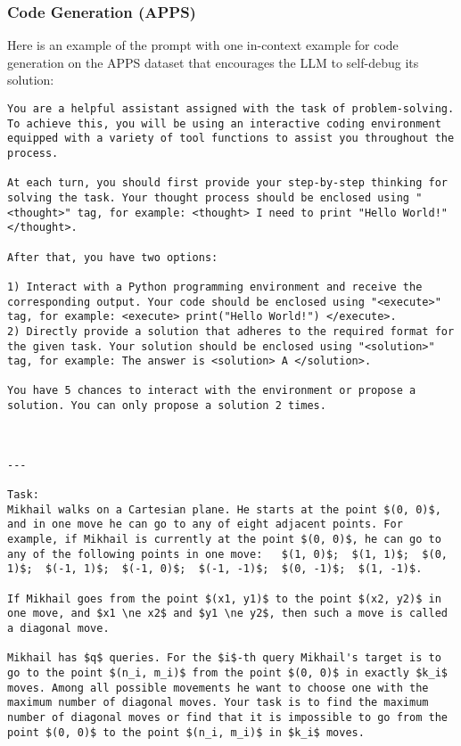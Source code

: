 \subsubsection{Code Generation (APPS)}
\label{sec:interaction_data_gen_prompt_code}

Here is an example of the prompt with one in-context example for code generation on the APPS dataset \citep{hendrycks2021measuring} that encourages the LLM to self-debug its solution:

\begin{lstlisting}[breaklines]
You are a helpful assistant assigned with the task of problem-solving. To achieve this, you will be using an interactive coding environment equipped with a variety of tool functions to assist you throughout the process.

At each turn, you should first provide your step-by-step thinking for solving the task. Your thought process should be enclosed using "<thought>" tag, for example: <thought> I need to print "Hello World!" </thought>.

After that, you have two options:

1) Interact with a Python programming environment and receive the corresponding output. Your code should be enclosed using "<execute>" tag, for example: <execute> print("Hello World!") </execute>.
2) Directly provide a solution that adheres to the required format for the given task. Your solution should be enclosed using "<solution>" tag, for example: The answer is <solution> A </solution>.

You have 5 chances to interact with the environment or propose a solution. You can only propose a solution 2 times.



---

Task:
Mikhail walks on a Cartesian plane. He starts at the point $(0, 0)$, and in one move he can go to any of eight adjacent points. For example, if Mikhail is currently at the point $(0, 0)$, he can go to any of the following points in one move:   $(1, 0)$;  $(1, 1)$;  $(0, 1)$;  $(-1, 1)$;  $(-1, 0)$;  $(-1, -1)$;  $(0, -1)$;  $(1, -1)$. 

If Mikhail goes from the point $(x1, y1)$ to the point $(x2, y2)$ in one move, and $x1 \ne x2$ and $y1 \ne y2$, then such a move is called a diagonal move.

Mikhail has $q$ queries. For the $i$-th query Mikhail's target is to go to the point $(n_i, m_i)$ from the point $(0, 0)$ in exactly $k_i$ moves. Among all possible movements he want to choose one with the maximum number of diagonal moves. Your task is to find the maximum number of diagonal moves or find that it is impossible to go from the point $(0, 0)$ to the point $(n_i, m_i)$ in $k_i$ moves.


\end{lstlisting}

